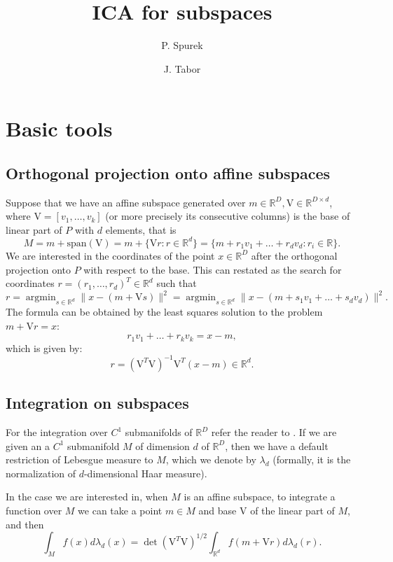 \documentclass[12pt]{article}
\title{ICA for subspaces}
\author{P. Spurek \and J. Tabor}
\date{}
\def\R{\mathbb{R}}
\def\v{\mathrm{V}}
\def\span{\mathrm{span}}
\theoremstyle{definition}
\DeclareMathOperator*{\argmin}{argmin}
\begin{document}
\maketitle





\section{Basic tools}


\subsection{Orthogonal projection onto affine subspaces}

Suppose that we have an affine subspace generated over $m \in \R^D,\v \in \R^{D \times d}$, where 
$\v=[v_1,\ldots,v_k]$ (or more precisely its consecutive columns) is the base of linear part of $P$ with $d$ elements, that is
$$
M=m+\span (\v)=m+\{\v r:r \in \R^d\}=\{m+r_1v_1+\ldots+r_dv_d: r_i \in \R\}.
$$
We are interested in the coordinates of the point $x \in \R^D$ after the orthogonal
projection onto $P$ with respect to the base.
This can restated as the search for coordinates $r=(r_1,\ldots,r_d)^T \in \R^d$
such that
$$
r=\argmin_{s \in \R^d} \|x-(m+\v s)\|^2=\argmin_{s \in \R^d} \|x-(m+s_1v_1+\ldots+s_dv_d)\|^2.
$$
The formula can be obtained by the least squares solution to the problem $m+\v r=x$:
$$
r_1v_1+\ldots+r_kv_k=x-m,
$$
which is given by:
$$
r=(\v^T\v)^{-1}\v^T(x-m) \in \R^d.
$$


\subsection{Integration on subspaces}

For the integration over $C^1$ submanifolds of $\R^D$ refer the reader to  \cite{munkres1997analysis, federer2014geometric}. If we are given an a $C^1$ submanifold $M$  of dimension $d$ of $\R^D$, then we have a default restriction of Lebesgue measure to $M$, which we denote by $\lambda_d$ (formally, it is the normalization of $d$-dimensional Haar measure).

In the case we are interested in, when $M$ is an affine subspace, to integrate
a function over $M$ we can take a point $m \in M$ and base $\v$ of the linear part
of $M$, and then
$$
\int_M f(x) d\lambda_d(x)=\det(\v^T\v)^{1/2} \int_{\R^d} f(m+\v r) d\lambda_d(r).
$$
\end{document}
